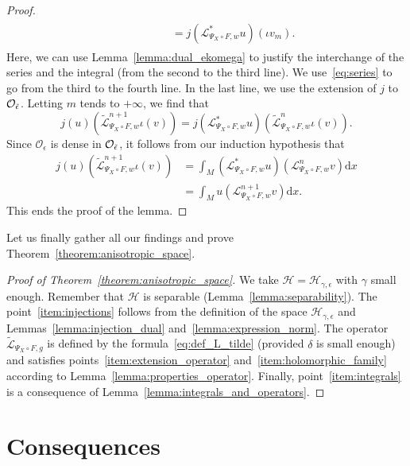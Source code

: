 \documentclass[10pt]{amsart}
\theoremstyle{definition}\newtheorem{defi}[theo]{Definition}\newtheorem{rema}[theo]{Remark}\newtheorem{exam}[theo]{Example}\newtheorem{exem}[theo]{Example}\newtheorem{nota}[theo]{Notation}
\newcommand{\p}[1]{\left(#1\right)}
\newcommand{\clO}{\mathcal{O}}
\newcommand{\clL}{\mathcal{L}}
\newcommand{\clH}{\mathcal{H}}
\newcommand{\rmd}{\mathrm{d}}
\let\oldtilde\tilde
\renewcommand*{\tilde}[1]{\mathchoice{\widetilde{#1}}{\widetilde{#1}}{\oldtilde{#1}}{\oldtilde{#1}}}
\begin{document}
\begin{proof}
\begin{multline*}
\begin{aligned}
& \qquad \qquad = j\left(\clL_{\Psi_X \circ F,w}^* u\right)(\iota v_m).
\end{aligned}
\end{multline*}
Here, we can use Lemma~\ref{lemma:dual_ekomega} to justify the interchange of the series and the integral (from the second to the third line). We use~\eqref{eq:series} to go from the third to the fourth line. In the last line, we use the extension of $j$ to $\clO_{\tilde{\epsilon}}$. Letting $m$ tends to $+ \infty$, we find that
\begin{equation*}
j(u)\p{\widetilde{\clL}_{\Psi_X \circ F,w}^{n+1} \iota(v)} = j\left(\clL_{\Psi_X \circ F,w}^* u\right)\p{\widetilde{\clL}_{\Psi_X \circ F,w}^{n} \iota(v)}.
\end{equation*}
Since $\clO_\epsilon$ is dense in $\clO_{\tilde{\epsilon}}$, it follows from our induction hypothesis that
\begin{align*}
j(u)\p{\widetilde{\clL}_{\Psi_X \circ F,w}^{n+1} \iota(v)} & = \int_M \left(\clL_{\Psi_X \circ F,w}^* u\right) \left(\clL_{\Psi_X \circ F,w}^{n} v\right) \rmd x \\
& = \int_M u\left(\clL_{\Psi_X \circ F,w}^{n+1} v\right) \rmd x.
\end{align*}
This ends the proof of the lemma.
\end{proof}

Let us finally gather all our findings and prove Theorem~\ref{theorem:anisotropic_space}.

\begin{proof}[Proof of Theorem~\ref{theorem:anisotropic_space}]
We take $\clH = \clH_{\gamma,\epsilon}$ with $\gamma$ small enough. Remember that $\clH$ is separable (Lemma~\ref{lemma:separability}). The point~\eqref{item:injections} follows from the definition of the space $\clH_{\gamma,\epsilon}$ and Lemmas~\ref{lemma:injection_dual} and~\ref{lemma:expression_norm}. The operator $\widetilde{\clL}_{\Psi_X \circ F,g}$ is defined by the formula~\eqref{eq:def_L_tilde} (provided $\delta$ is small enough) and satisfies points~\eqref{item:extension_operator} and~\eqref{item:holomorphic_family} according to Lemma~\ref{lemma:properties_operator}. Finally, point~\eqref{item:integrals} is a consequence of Lemma~\ref{lemma:integrals_and_operators}.
\end{proof}

\section{Consequences}\label{section:consequences}
\end{document}
